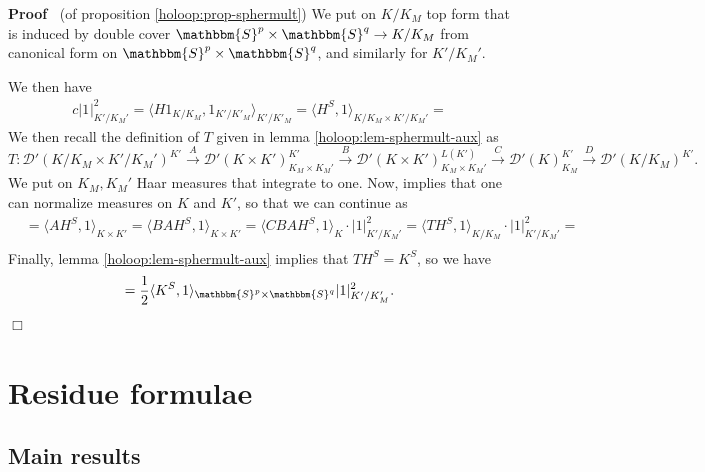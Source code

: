 \documentclass{article}
\newenvironment{proof}{\noindent\textbf{Proof\ }}{\hspace*{\fill}$\Box$\medskip}
\begin{document}
\begin{proof}
  (of proposition \ref{holoop:prop-sphermult}) We put on $K / K_M$ top form
  that is induced by double cover $\mathbbm{S}^p \times \mathbbm{S}^q
  \rightarrow K / K_M$ from canonical form on $\mathbbm{S}^p \times
  \mathbbm{S}^q$, and similarly for $K' / K_M'$.
  
  We then have
  \begin{eqnarray}
    & c | 1_{} |^2_{K' / K_M'} = \langle H 1_{K / K_M}, 1_{K' / K'_M}
    \rangle_{K' / K'_M} = \langle H^S, 1 \rangle_{K / K_M \times K' / K_M'} =
    &  \nonumber
  \end{eqnarray}
  We then recall the definition of $T$ given in lemma
  \ref{holoop:lem-sphermult-aux} as
  \[ T : \mathcal{D}' (K / K_M \times K' / K_M')^{K'} \xrightarrow{A}
     \mathcal{D}' (K \times K')_{K_M \times K_M'}^{K'} \xrightarrow{B}
     \mathcal{D}' (K \times K')_{K_M \times K_M'}^{L (K')} \xrightarrow{C}
     \mathcal{D}' (K)^{K'}_{K_M} \xrightarrow{D} \mathcal{D}' (K / K_M)^{K'} .
  \]
  We put on $K_M, K_M'$ Haar measures that integrate to one. Now,
  {\cite[0.1.2]{wallach1988real}} implies that one can normalize measures on
  $K$ and $K'$, so that we can continue as
  \begin{eqnarray}
    & = \langle A H^S, 1 \rangle_{K \times K'} = \langle B A H^S, 1
    \rangle_{K \times K'} = \langle C B A H^S, 1 \rangle_K \cdot | 1 |^2_{K' /
    K_M'} = \langle T H^S, 1 \rangle_{K / K_M} \cdot | 1 |^2_{K' / K_M'} = & 
    \nonumber\\
    &  &  \nonumber
  \end{eqnarray}
  Finally, lemma \ref{holoop:lem-sphermult-aux} implies that $T H^S = K^S$, so
  we have
  \[ = \frac{1}{2} \langle K^S, 1 \rangle_{\mathbbm{S}^p \times \mathbbm{S}^q}
     | 1 |^2_{K' / K_M'} . \]
\end{proof}

\section{Residue formulae}\label{sec:resform}

\subsection{Main results}
\end{document}
